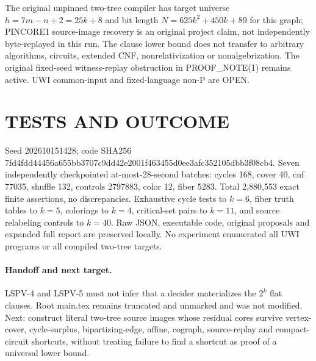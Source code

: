 \documentclass{article}
\begin{document}
The original unpinned two-tree compiler has target universe $h=7m-n+2=25k+8$ and bit length $N=625k^2+450k+89$ for this graph; PINCORE1 source-image recovery is an original project claim, not independently byte-replayed in this run. The clause lower bound does not transfer to arbitrary algorithms, circuits, extended CNF, nonrelativization or nonalgebrization. The original fixed-seed witness-replay obstruction in PROOF\_NOTE(1) remains active. UWI common-input and fixed-language non-P are OPEN.

\section{TESTS AND OUTCOME}
Seed 202610151428; code SHA256 7fd4fdd44456a655bb3707c9dd42e2001f463455d0ee3afc352105dbb3f08cb4. Seven independently checkpointed at-most-28-second batches: cycles 168, cover 40, cnf 77035, shuffle 132, controls 2797883, color 12, fiber 5283. Total 2,880,553 exact finite assertions, no discrepancies. Exhaustive cycle tests to $k=6$, fiber truth tables to $k=5$, colorings to $k=4$, critical-set pairs to $k=11$, and source relabeling controls to $k=40$. Raw JSON, executable code, original proposals and expanded full report are preserved locally. No experiment enumerated all UWI programs or all compiled two-tree targets.

\paragraph{Handoff and next target.} LSPV-4 and LSPV-5 must not infer that a decider materializes the $2^k$ flat clauses. Root main.tex remains truncated and unmarked and was not modified. Next: construct literal two-tree source images whose residual cores survive vertex-cover, cycle-surplus, bipartizing-edge, affine, cograph, source-replay and compact-circuit shortcuts, without treating failure to find a shortcut as proof of a universal lower bound.
\end{document}
